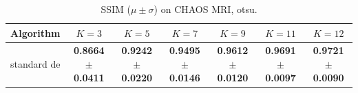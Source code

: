 \begin{table}[htbp]
\centering
\caption{SSIM ($\mu \pm \sigma$) on CHAOS MRI, otsu.}
\label{tab:exp2-otsu-ssim}
\begin{tabular}{lcccccc}
\toprule
Algorithm & $K=3$ & $K=5$ & $K=7$ & $K=9$ & $K=11$ & $K=12$ \\
\midrule
standard de & \textbf{0.8664 $\pm$ 0.0411} & \textbf{0.9242 $\pm$ 0.0220} & \textbf{0.9495 $\pm$ 0.0146} & \textbf{0.9612 $\pm$ 0.0120} & \textbf{0.9691 $\pm$ 0.0097} & \textbf{0.9721 $\pm$ 0.0090} \\
\bottomrule
\end{tabular}
\end{table}